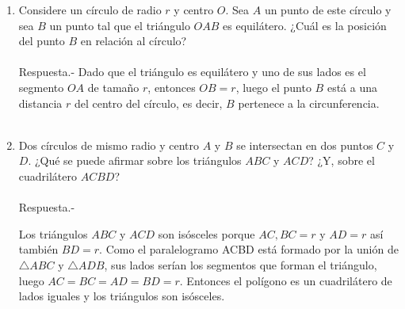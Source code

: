 \documentclass[10pt]{article}
\begin{document}
\begin{enumerate}
	\item Considere un círculo de radio $r$ y centro $O$. Sea $A$ un punto de este círculo y sea $B$ un punto tal que el triángulo $OAB$ es equilátero. ¿Cuál es la posición del punto $B$ en relación al círculo?\\\\
	Respuesta.-\; Dado que el triángulo es equilátero y uno de sus lados es el segmento $OA$ de tamaño $r$, entonces $OB = r$, luego el punto $B$ está a una distancia $r$ del centro del círculo, es decir, $B$ pertenece a la circunferencia.\\\\

	\item Dos círculos de mismo radio y centro $A$ y $B$ se intersectan en dos puntos $C$ y $D$. ¿Qué se puede afirmar sobre los triángulos $ABC$ y $ACD$? ¿Y, sobre el cuadrilátero $ACBD$?\\\\
	Respuesta.-\; 
	\begin{center}
	\end{center}
	Los triángulos $ABC$ y $ACD$ son isósceles porque $AC, BC = r $ y $AD = r$  así también $BD = r$. Como el paralelogramo ACBD está formado por la unión de $\triangle ABC$ y $\triangle ADB$, sus lados serían los segmentos que forman el triángulo,  luego $AC = BC = AD = BD = r$. Entonces el polígono es un cuadrilátero de lados iguales y los triángulos son isósceles.\\\\


\end{enumerate}
\end{document}
